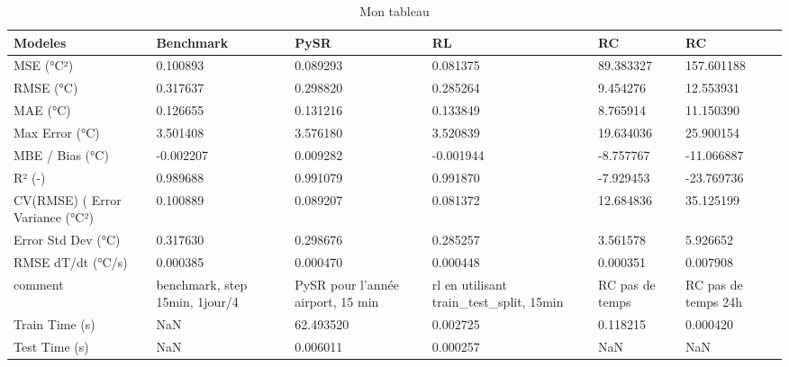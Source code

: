 \begin{table}
\caption{Mon tableau}
\label{tab:mon_tableau}
\begin{tabular}{llllll}
\toprule
Modeles & Benchmark & PySR & RL & RC & RC \\
\midrule
MSE (°C²) & 0.100893 & 0.089293 & 0.081375 & 89.383327 & 157.601188 \\
RMSE (°C) & 0.317637 & 0.298820 & 0.285264 & 9.454276 & 12.553931 \\
MAE (°C) & 0.126655 & 0.131216 & 0.133849 & 8.765914 & 11.150390 \\
Max Error (°C) & 3.501408 & 3.576180 & 3.520839 & 19.634036 & 25.900154 \\
MBE / Bias (°C) & -0.002207 & 0.009282 & -0.001944 & -8.757767 & -11.066887 \\
R² (-) & 0.989688 & 0.991079 & 0.991870 & -7.929453 & -23.769736 \\
CV(RMSE) (%
Error Variance (°C²) & 0.100889 & 0.089207 & 0.081372 & 12.684836 & 35.125199 \\
Error Std Dev (°C) & 0.317630 & 0.298676 & 0.285257 & 3.561578 & 5.926652 \\
RMSE dT/dt (°C/s) & 0.000385 & 0.000470 & 0.000448 & 0.000351 & 0.007908 \\
comment & benchmark, step 15min, 1jour/4 & PySR pour l'année airport, 15 min & rl en utilisant train_test_split, 15min & RC pas de temps & RC pas de temps 24h \\
Train Time (s) & NaN & 62.493520 & 0.002725 & 0.118215 & 0.000420 \\
Test Time (s) & NaN & 0.006011 & 0.000257 & NaN & NaN \\
\bottomrule
\end{tabular}
\end{table}

